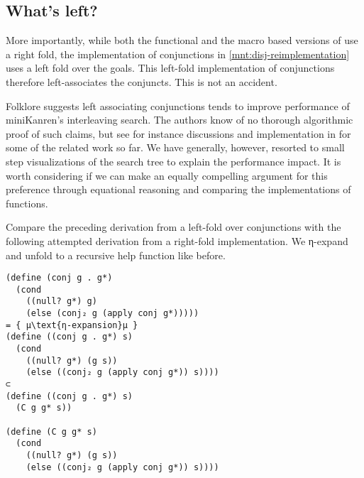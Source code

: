 \documentclass[sigplan,balance=true,pbalance=true,natbib=false]{acmart}
\begin{document}
\subsection{What's left?}\label{sec:whats-left}

More importantly, while both the functional and the macro based
versions of  use a right fold, the implementation of
conjunctions in \cref{mnt:disj-reimplementation} uses a left fold over
the goals. This left-fold implementation of conjunctions therefore
left-associates the conjuncts. This is not an accident.

%
Folklore suggests left associating conjunctions tends to improve
performance of miniKanren's interleaving search. The authors know of
no thorough algorithmic proof of such claims, but see for instance
discussions and implementation in
\citet{rosenblatt2019first} for some of
the related work so far. We have generally, however, resorted to small
step visualizations of the search tree to explain the performance
impact. It is worth considering if we can make an equally compelling
argument for this preference through equational reasoning and
comparing the implementations of functions.



Compare the preceding derivation from a left-fold over conjunctions
with the following attempted derivation from a right-fold
implementation. We η-expand and unfold to a recursive help
function like before.

\begin{verbatim}
(define (conj g . g*)
  (cond
    ((null? g*) g)
    (else (conj₂ g (apply conj g*)))))
= { μ\text{η-expansion}μ }
(define ((conj g . g*) s)
  (cond
    ((null? g*) (g s))
    (else ((conj₂ g (apply conj g*)) s))))
⊂
(define ((conj g . g*) s)
  (C g g* s))

(define (C g g* s)
  (cond
    ((null? g*) (g s))
    (else ((conj₂ g (apply conj g*)) s))))
\end{verbatim}
\end{document}
